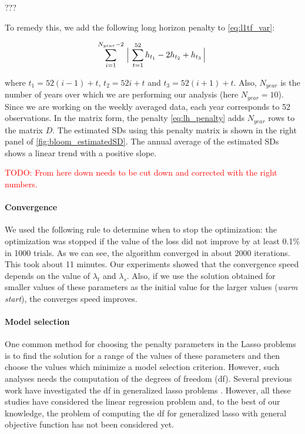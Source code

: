 \documentclass{article}
\newcommand{\attn}[1]{\textcolor{red}{TODO: #1}}
\begin{document}
???

To remedy this, we add the following long horizon penalty
to \eqref{eq:l1tf_var}:
 
\begin{equation}
\sum_{i=1}^{N_{year}-2} \Big\arrowvert \sum_{t=1}^{52} h_{t_1}-2h_{t_2}+h_{t_3}  \Big\arrowvert
\label{eq:lh_penalty}
\end{equation}

where $t_1=52(i-1)+t$, $t_2=52i+t$ and $t_3=52(i+1)+t$. Also, $N_{year}$ is the number of years over which we are performing our analysis (here $N_{year}=10$). Since we are working on the weekly averaged data, each year corresponds to 52 observations. In the matrix form, the penalty \eqref{eq:lh_penalty} adds $N_{year}$ rows to the matrix $D$. The estimated SDs using this penalty matrix is shown in the right panel of \autoref{fig:bloom_estimatedSD}. The annual average of the estimated SDs shows a linear trend with a positive slope. 




\attn{From here down needs to be cut down and corrected with the right numbers.}




\paragraph{Convergence}

We used the following rule to determine when to stop the optimization:
the optimization was stopped if the value of the loss did not improve
by at least 0.1\% in 1000 trials. As we can see, the algorithm
converged in about 2000 iterations. This took about 11 minutes. Our
experiments showed that the convergence speed depends on the value of
$\lambda_t$ and $\lambda_s$. Also, if we use the solution obtained for
smaller values of these parameters as the initial value for the larger
values (\textit{warm start}), the converges speed improves. 


\paragraph{Model selection}
One common method for choosing the penalty parameters in the Lasso
problems is to find the solution for a range of the values of these
parameters and then choose the values which minimize a model selection
criterion. However, such analyses needs the computation of the degrees
of freedom (df). Several previous work have investigated the df in
generalized lasso problems
\citep{tibshirani_degrees_2012,hu_dual_2015,zeng_geometry_2017}. However,
all these studies have considered the linear regression problem and,
to the best of our knowledge, the problem of computing the df for
generalized lasso with general objective function has not been
considered yet. 
\end{document}
